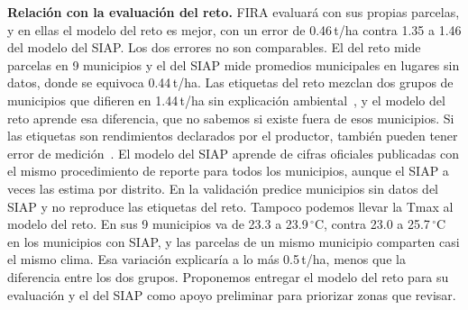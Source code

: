\textbf{Relación con la evaluación del reto.} FIRA evaluará con sus propias parcelas, y en ellas el modelo del reto es
mejor, con un error de 0.46\,t/ha contra 1.35 a 1.46 del modelo del SIAP. Los dos errores no son comparables. El del
reto mide parcelas en 9 municipios y el del SIAP mide promedios municipales en lugares sin datos, donde se equivoca
0.44\,t/ha. Las etiquetas del reto mezclan dos grupos de municipios que difieren en 1.44\,t/ha sin explicación
ambiental~\cite{regimenes}, y el modelo del reto aprende esa diferencia, que no sabemos si existe fuera de esos
municipios. Si las etiquetas son rendimientos declarados por el productor, también pueden tener error de
medición~\cite{lobell2020,gourlay2019}. El modelo del SIAP aprende de cifras oficiales publicadas con el mismo
procedimiento de reporte para todos los municipios, aunque el SIAP a veces las estima por distrito. En la validación
predice municipios sin datos del SIAP y no reproduce las etiquetas del reto.
Tampoco podemos llevar la Tmax al modelo del reto. En sus 9 municipios va de 23.3 a 23.9\,$^\circ$C, contra 23.0 a
25.7\,$^\circ$C en los municipios con SIAP, y las parcelas de un mismo municipio comparten casi el mismo clima. Esa
variación explicaría a lo más 0.5\,t/ha, menos que la diferencia entre los dos grupos.
Proponemos entregar el modelo del reto para su evaluación y el del SIAP como apoyo preliminar para priorizar zonas
que revisar.
